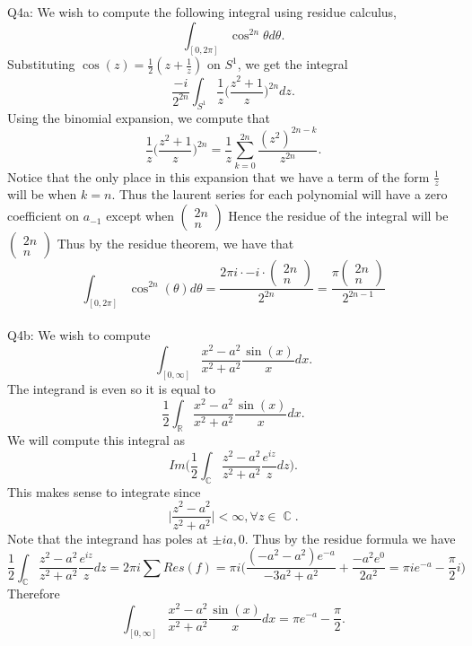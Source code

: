 \documentclass[letterpaper]{article}
\DeclareMathOperator{\R}{\mathbb{R}}
\DeclareMathOperator{\C}{\mathbb{C}}
\begin{document}
\noindent Q4a: We wish to compute the following integral using residue calculus, $$\int_{[0,2\pi]} \cos^{2n}\theta d\theta.$$
Substituting $\cos(z) = \frac{1}{2}(z+\frac{1}{z})$ on $S^1$, we get the integral $$\frac{-i}{2^{2n}} \int_{S^1} \frac{1}{z} \Big( \frac{z^2+1}{z}\Big)^{2n} dz.$$
Using the binomial expansion, we compute that $$\frac{1}{z}\Big(\frac{z^2+1}{z} \Big)^{2n} = \frac{1}{z} \sum_{k=0}^{2n}\frac{(z^2)^{2n-k}}{z^{2n}}. $$
Notice that the only place in this expansion that we have a term of the form $\frac{1}{z}$ will be when $k=n$. Thus the laurent series for each polynomial will have a zero coefficient on $a_{-1}$ except when $\begin{pmatrix}
    2n \\ n
\end{pmatrix}$ Hence the residue of the integral will be $\begin{pmatrix}
    2n \\ n
\end{pmatrix}$ Thus by the residue theorem, we have that $$\int_{[0,2\pi]} \cos^{2n}(\theta) d\theta = \frac{2\pi i\cdot -i \cdot \begin{pmatrix} 2n \\ n \end{pmatrix} }{2^{2n}} = \frac{\pi \begin{pmatrix} 2n \\ n \end{pmatrix} }{2^{2n-1}}$$
\newline \\ Q4b: We wish to compute $$\int_{[0,\infty]} \frac{x^2-a^2}{x^2+a^2}\frac{\sin(x)}{x}dx. $$ The integrand is even so it is equal to $$\frac{1}{2} \int_{\R} \frac{x^2-a^2}{x^2+a^2}\frac{\sin(x)}{x}dx.$$ We will compute this integral as $$Im \Big( \frac{1}{2} \int_{\C} \frac{z^2-a^2}{z^2+a^2}\frac{e^{iz}}{z}dz \Big). $$ This makes sense to integrate since $$\Big|\frac{z^2-a^2}{z^2+a^2} \Big|< \infty, \forall z\in \C .$$ 
 Note that the integrand has poles at $\pm ia, 0$. Thus by the residue formula we have $$\frac{1}{2}\int_{\C} \frac{z^2-a^2}{z^2+a^2}\frac{e^{iz}}{z}dz = 2\pi i\sum Res(f) = \pi i \Big( \frac{(-a^2 - a^2)e^{-a}}{-3a^2 + a^2} + \frac{-a^2 e^{0}}{2a^2} = \pi ie^{-a} - \frac{\pi}{2} i \Big)$$
Therefore $$\int_{[0,\infty]} \frac{x^2-a^2}{x^2+a^2} \frac{\sin(x)}{x}dx  = \pi e^{-a} - \frac{\pi}{2}.$$
\end{document}
